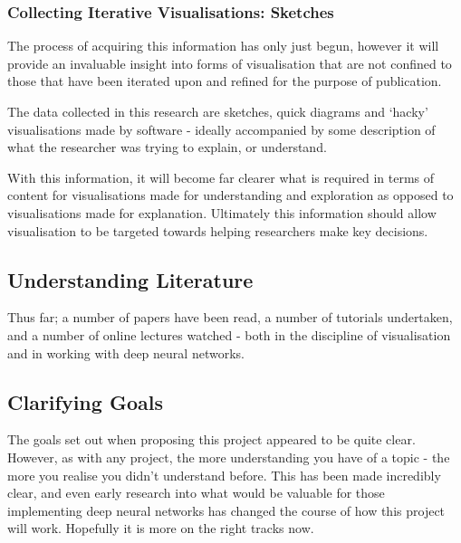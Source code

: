 \documentclass[a4paper,11pt,titlepage]{article}
\begin{document}
		\subsubsection{Collecting Iterative Visualisations: Sketches}
		The process of acquiring this information has only just begun, however it will provide an invaluable insight into forms of visualisation that are not confined to those that have been iterated upon and refined for the purpose of publication. 
		\par 
		The data collected in this research are sketches, quick diagrams and `hacky' visualisations made by software - ideally accompanied by some description of what the researcher was trying to explain, or understand.
		\par 
		With this information, it will become far clearer what is required in terms of content for visualisations made for understanding and exploration as opposed to visualisations made for explanation. Ultimately this information should allow visualisation to be targeted towards helping researchers make key decisions. 
	\subsection{Understanding Literature}
	Thus far; a number of papers have been read, a number of tutorials undertaken, and a number of online lectures watched - both in the discipline of visualisation and in working with deep neural networks.
	\subsection{Clarifying Goals}
	The goals set out when proposing this project appeared to be quite clear. However, as with any project, the more understanding you have of a topic - the more you realise you didn't understand before. This has been made incredibly clear, and even early research into what would be valuable for those implementing deep neural networks has changed the course of how this project will work. Hopefully it is more on the right tracks now.

\clearpage




\clearpage
\appendix
\end{document}
